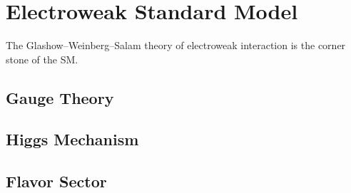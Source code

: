 \chapter{Electroweak Standard Model}
\label{sec:SM}

The Glashow–Weinberg–Salam theory of electroweak interaction is the corner stone of the \ac{SM}. 

\section{Gauge Theory}

\section{Higgs Mechanism}

\section{Flavor Sector}